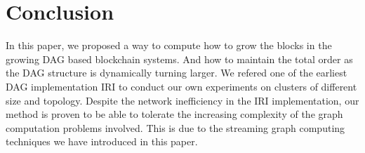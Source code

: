 \section{Conclusion}
In this paper, we proposed a way to compute how to grow the blocks in the growing DAG based blockchain systems. 
And how to maintain the total order as the DAG structure is dynamically turning larger.
We refered one of the earliest DAG implementation IRI to conduct our own experiments on clusters of different size and topology. 
Despite the network inefficiency in the IRI implementation, 
our method is proven to be able to tolerate the increasing complexity of the graph computation problems involved. 
This is due to the streaming graph computing techniques we have introduced in this paper.
